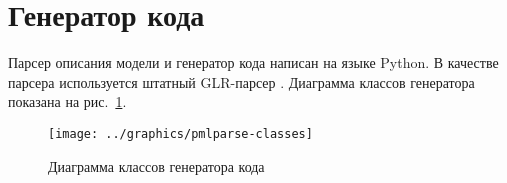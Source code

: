 \section{Генератор кода}
\label{sec:promela-parser}

Парсер описания модели и генератор кода написан на языке Python. В качестве парсера
используется штатный GLR-парсер . Диаграмма классов генератора показана на
рис.~\ref{fig:pmlparse-classes}.

\begin{figure}[ht]
  \centering
  \texttt{[image: ../graphics/pmlparse-classes]}
  \caption{Диаграмма классов генератора кода}
  \label{fig:pmlparse-classes}
\end{figure}





